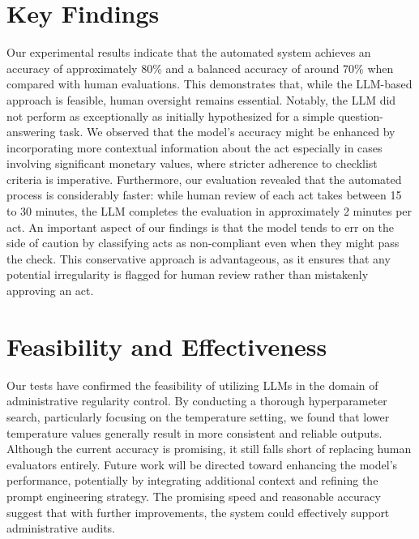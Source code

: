 \documentclass[../main.tex]{subfiles}
\begin{document}
\section*{Key Findings}
Our experimental results indicate that the automated system achieves an accuracy of approximately 80\% and a balanced accuracy of around 70\% when compared with human evaluations. This demonstrates that, while the LLM-based approach is feasible, human oversight remains essential. Notably, the LLM did not perform as exceptionally as initially hypothesized for a simple question-answering task. We observed that the model's accuracy might be enhanced by incorporating more contextual information about the act especially in cases involving significant monetary values, where stricter adherence to checklist criteria is imperative. Furthermore, our evaluation revealed that the automated process is considerably faster: while human review of each act takes between 15 to 30 minutes, the LLM completes the evaluation in approximately 2 minutes per act. An important aspect of our findings is that the model tends to err on the side of caution by classifying acts as non-compliant even when they might pass the check. This conservative approach is advantageous, as it ensures that any potential irregularity is flagged for human review rather than mistakenly approving an act.

\section*{Feasibility and Effectiveness}
Our tests have confirmed the feasibility of utilizing LLMs in the domain of administrative regularity control. By conducting a thorough hyperparameter search, particularly focusing on the temperature setting, we found that lower temperature values generally result in more consistent and reliable outputs. Although the current accuracy is promising, it still falls short of replacing human evaluators entirely. Future work will be directed toward enhancing the model's performance, potentially by integrating additional context and refining the prompt engineering strategy. The promising speed and reasonable accuracy suggest that with further improvements, the system could effectively support administrative audits.
\end{document}

